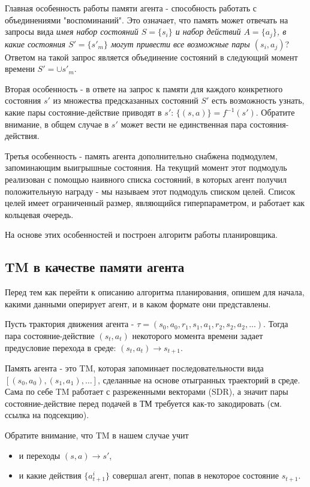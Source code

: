 \documentclass[a4paper]{article}
\begin{document}
Главная особенность работы памяти агента - способность работать с объединениями "воспоминаний". Это означает, что память может отвечать на запросы вида \textit{имея набор состояний $S=\{s_i\}$ и набор действий $A=\{a_j\}$, в какие состояния $S'=\{s'_m\}$ могут привести все возможные пары $(s_i, a_j)$}? Ответом на такой запрос является объединение состояний в следующий момент времени $S' = \cup s'_m$.

Вторая особенность - в ответе на запрос к памяти для каждого конкретного состояния $s'$ из множества предсказанных состояний $S'$ есть возможность узнать, какие пары состояние-действие приводят в $s'$: $\{(s, a)\} = f^{-1}(s')$. Обратите внимание, в общем случае в $s'$ может вести не единственная пара состояния-действия.

Третья особенность - память агента дополнительно снабжена подмодулем, запоминающим выигрышные состояния. На текущий момент этот подмодуль реализован с помощью наивного списка состояний, в которых агент получил положительную награду - мы называем этот подмодуль списком целей. Список целей имеет ограниченный размер, являющийся гиперпараметром, и работает как кольцевая очередь.

На основе этих особенностей и построен алгоритм работы планировщика.

\subsection{TM в качестве памяти агента}

Перед тем как перейти к описанию алгоритма планирования, опишем для начала, какими данными оперирует агент, и в каком формате они представлены.

Пусть трактория движения агента - $\tau = (s_0, a_0, r_1, s_1, a_1, r_2, s_2, a_2, ...)$. Тогда пара состояние-действие $(s_t, a_t)$ некоторого момента времени задает предусловие перехода в среде: $(s_t, a_t) \rightarrow s_{t+1}$.

Память агента - это TM, которая запоминает последовательности вида $[(s_0, a_0), (s_1, a_1), \dots]$, сделанные на основе отыгранных траекторий в среде. Сама по себе TM работает с разреженными векторами (SDR), а значит пары состояние-действие перед подачей в ТМ требуется как-то закодировать (см. ссылка на подсекцию).

Обратите внимание, что TM в нашем случае учит
\begin{itemize}
  \item и переходы $(s, a) \rightarrow s'$,
  \item и какие действия $\{a^i_{t+1}\}$ совершал агент, попав в некоторое состояние $s_{t+1}$.
\end{itemize}
\end{document}
